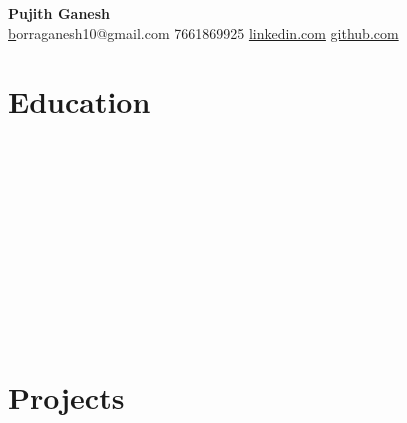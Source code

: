 \documentclass[a4paper,10pt]{article}
\begin{document}
\begin{center}
    {\huge \textbf{ Pujith Ganesh }} \\
    \vspace{5pt}
    \small \href{mailto:borraganesh10@gmail.com}borraganesh10@gmail.com \quad \textbullet{} 7661869925 \quad  \quad \textbullet{} \href{ https://www.linkedin.com/in/ganesh10-/ }{linkedin.com} \quad \textbullet{} \href{ https://github.com/ganesh10-code }{github.com}
\end{center}

\section*{Education}

\noindent
\textbf{  } \\
\textit{  } \hfill \textit{  } \\

\vspace{0.3cm}

\noindent
\textbf{  } \\
\textit{  } \hfill \textit{  } \\

\vspace{0.3cm}

\noindent
\textbf{  } \\
\textit{  } \hfill \textit{  } \\

\vspace{0.3cm}

\noindent
\textbf{  } \\
\textit{  } \hfill \textit{  } \\

\vspace{0.3cm}



\section*{Projects}
\end{document}

